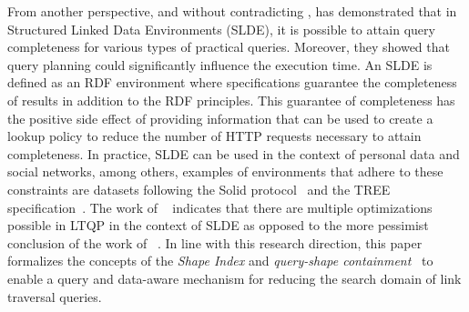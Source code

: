 From another perspective, and without contradicting \citeauthor{hartig2016walking}, \citeauthor{Taelman2023} has demonstrated that in Structured Linked Data Environments (SLDE),
it is possible to attain query completeness for various types of practical queries.
Moreover, they showed that query planning could significantly influence the execution time.
An SLDE is defined as an RDF environment where specifications guarantee the completeness of results in addition to the RDF principles.
This guarantee of completeness has the positive side effect of providing information
that can be used to create a lookup policy to reduce the number of HTTP requests necessary to attain completeness.
In practice, SLDE can be used in the context of personal data and social networks, among others,
examples of environments that adhere to these constraints are datasets following the Solid protocol~\cite{Taelman2023} and the TREE specification~\cite{tam_iswc_traversalsensortree_2024}.
The work of ~\citeauthor{Taelman2023} indicates that there are multiple optimizations possible in LTQP in the context of SLDE as opposed to the
more pessimist conclusion of the work of ~\citeauthor{hartig2016walking}.
In line with this research direction, this paper formalizes the concepts of the \emph{Shape Index} and \emph{query-shape containment}~\cite{tam2024opportunitiesshapebasedoptimizationlink} to enable a query and data-aware mechanism for reducing the search domain of link traversal queries.
\iffalse
The shape index concept relies on RDF data shapes; the conceptual idea of RDF data shapes is to describe the properties of an entity.
We propose to use them in an index to describe decentralized datasets.
Because shapes and queries share similarities, we propose transforming shapes into queries to perform a query containment problem
and assist our source selection.
\fi

